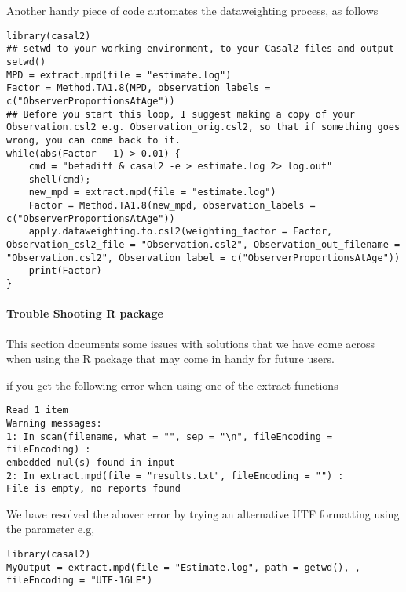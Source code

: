 Another handy piece of code automates the dataweighting process, as follows

\begin{lstlisting}
library(casal2)
## setwd to your working environment, to your Casal2 files and output
setwd()
MPD = extract.mpd(file = "estimate.log")
Factor = Method.TA1.8(MPD, observation_labels = c("ObserverProportionsAtAge"))
## Before you start this loop, I suggest making a copy of your Observation.csl2 e.g. Observation_orig.csl2, so that if something goes wrong, you can come back to it.
while(abs(Factor - 1) > 0.01) {
	cmd = "betadiff & casal2 -e > estimate.log 2> log.out"
	shell(cmd);
	new_mpd = extract.mpd(file = "estimate.log")
	Factor = Method.TA1.8(new_mpd, observation_labels = c("ObserverProportionsAtAge"))
	apply.dataweighting.to.csl2(weighting_factor = Factor, Observation_csl2_file = "Observation.csl2", Observation_out_filename = "Observation.csl2", Observation_label = c("ObserverProportionsAtAge"))
	print(Factor)
}
\end{lstlisting}
\paragraph*{Trouble Shooting R package}
This section documents some issues with solutions that we have come across when using the R package that may come in handy for future users.

if you get the following error when using one of the extract functions 
\begin{lstlisting}
Read 1 item
Warning messages:
1: In scan(filename, what = "", sep = "\n", fileEncoding = fileEncoding) :
embedded nul(s) found in input
2: In extract.mpd(file = "results.txt", fileEncoding = "") :
File is empty, no reports found
\end{lstlisting}

We have resolved the abover error by trying an alternative UTF formatting using the  parameter e.g,
\begin{lstlisting}
library(casal2)
MyOutput = extract.mpd(file = "Estimate.log", path = getwd(), , fileEncoding = "UTF-16LE")
\end{lstlisting}